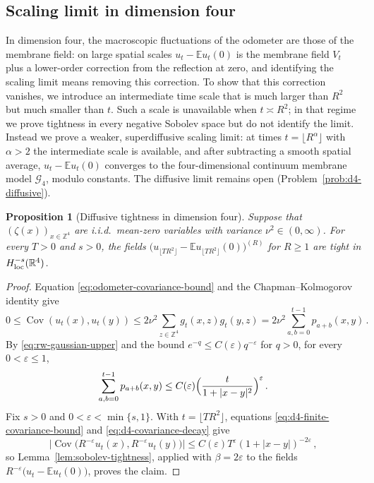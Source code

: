 \documentclass[11pt]{amsart}
\theoremstyle{plain}
\newtheorem{proposition}[theorem]{Proposition}
\theoremstyle{definition}
\newcommand{\Z}{\mathbb{Z}}
\newcommand{\R}{\mathbb{R}}
\newcommand{\E}{\mathbb{E}}
\DeclareMathOperator{\Cov}{Cov}
\begin{document}
	\subsection{Scaling limit in dimension four}
	\label{ssec:d4-spatial-scaling}

		In dimension four, the macroscopic fluctuations of the odometer are those
		of the membrane field: on large spatial scales $u_t-\E u_t(0)$ is the
		membrane field $V_t$ plus a lower-order correction from the reflection at
		zero, and identifying the scaling limit means removing this correction.
		To show that this correction vanishes, we introduce an intermediate time scale
        that is much larger than $R^2$ but much smaller than $t$. Such a scale is
        unavailable when $t\asymp R^2$; in that regime we prove tightness in every
        negative Sobolev space but do not identify the limit. Instead we prove a weaker, superdiffusive scaling limit: at times $t=\lfloor R^\alpha\rfloor$ with $\alpha>2$ the intermediate scale is available, and after subtracting a smooth spatial average, $u_t-\E u_t(0)$ converges to the four-dimensional continuum membrane model $\mathcal G_4$, modulo constants. The diffusive limit remains open (Problem~\ref{prob:d4-diffusive}).

		\begin{proposition}[Diffusive tightness in dimension four]
		\label{prop:d4-diffusive-tightness}
			Suppose that $(\zeta(x))_{x\in\Z^4}$ are i.i.d.\ mean-zero variables
			with variance $\nu^2\in(0,\infty)$. For every $T>0$ and $s>0$, the
			fields
			$\bigl(u_{\lfloor TR^2\rfloor}-\E u_{\lfloor TR^2\rfloor}(0)\bigr)^{(R)}$
			for $R\geq1$ are tight in $H^{-s}_{\rm loc}(\R^4)$.
		\end{proposition}
		\begin{proof}
			Equation \eqref{eq:odometer-covariance-bound} and the
			Chapman--Kolmogorov identity give
			\begin{equation}\label{eq:d4-finite-covariance-bound}
				0\leq\Cov(u_t(x),u_t(y))
				\leq2\nu^2\sum_{z\in\Z^4}g_t(x,z)g_t(y,z)
				=2\nu^2\sum_{a,b=0}^{t-1}p_{a+b}(x,y)\, .
			\end{equation}
			By \eqref{eq:rw-gaussian-upper} and the bound
			$e^{-q}\leq C(\varepsilon) q^{-\varepsilon}$ for $q>0$, for every
			$0<\varepsilon\leq1$,
			\begin{equation}\label{eq:d4-covariance-decay}
				\sum_{a,b=0}^{t-1}p_{a+b}(x,y)
				\leq C(\varepsilon)
				\Bigl(\frac t{1+|x-y|^2}\Bigr)^{\varepsilon}\, .
			\end{equation}
			Fix $s>0$ and $0<\varepsilon<\min\{s,1\}$. With
			$t=\lfloor TR^2\rfloor$, equations
			\eqref{eq:d4-finite-covariance-bound} and
			\eqref{eq:d4-covariance-decay} give
			\[
				\bigl|\Cov\bigl(R^{-\varepsilon}u_t(x),
				R^{-\varepsilon}u_t(y)\bigr)\bigr|
				\leq C(\varepsilon)T^{\varepsilon}
				(1+|x-y|)^{-2\varepsilon}\, ,
			\]
			so Lemma~\ref{lem:sobolev-tightness}, applied with
			$\beta=2\varepsilon$ to the fields
			$R^{-\varepsilon}\bigl(u_t-\E u_t(0)\bigr)$, proves the claim.
		\end{proof}
\end{document}
